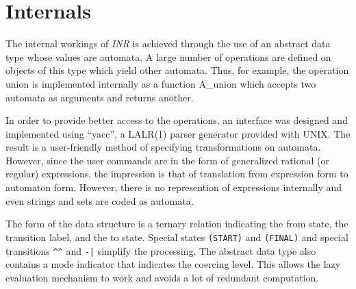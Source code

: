 \section{Internals}
The internal workings of {\em INR} is achieved through the use of an
abstract data type whose values are automata.
A large number of operations are defined on objects of this type which
yield other automata.
Thus, for example, the operation union is implemented internally as a
function A\_union which accepts two automata as arguments and returns another.

In order to provide better access to the operations, an interface was
designed and implemented using ``yacc'', a LALR(1) parser generator
provided with UNIX.
The result is a user-friendly method of specifying transformations on
automata.
However, since the user commands are in the form of generalized rational
(or regular) expressions, the impression is that of translation from
expression form to automaton form.
However, there is no represention of expressions internally and even
strings and sets are coded as automata.

The form of the data structure is a ternary relation indicating the from
state, the transition label, and the to state.
Special states \verb#(START)# and \verb#(FINAL)# and special transitions
\verb#^^# and \verb#-|# simplify the processing.
The abstract data type also contains a mode indicator that indicates the
coercing level.
This allows the lazy evaluation mechanism to work and avoids a lot of
redundant computation.
